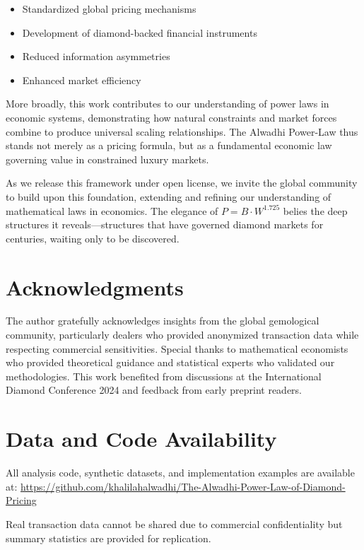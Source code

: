 \documentclass[12pt,a4paper]{article}
\theoremstyle{definition}
\theoremstyle{remark}
\begin{document}
\begin{itemize}
\item Standardized global pricing mechanisms
\item Development of diamond-backed financial instruments
\item Reduced information asymmetries
\item Enhanced market efficiency
\end{itemize}

More broadly, this work contributes to our understanding of power laws in economic systems, demonstrating how natural constraints and market forces combine to produce universal scaling relationships. The Alwadhi Power-Law thus stands not merely as a pricing formula, but as a fundamental economic law governing value in constrained luxury markets.

As we release this framework under open license, we invite the global community to build upon this foundation, extending and refining our understanding of mathematical laws in economics. The elegance of $P = B \cdot W^{1.725}$ belies the deep structures it reveals—structures that have governed diamond markets for centuries, waiting only to be discovered.

\section*{Acknowledgments}

The author gratefully acknowledges insights from the global gemological community, particularly dealers who provided anonymized transaction data while respecting commercial sensitivities. Special thanks to mathematical economists who provided theoretical guidance and statistical experts who validated our methodologies. This work benefited from discussions at the International Diamond Conference 2024 and feedback from early preprint readers.

\section*{Data and Code Availability}

All analysis code, synthetic datasets, and implementation examples are available at: \url{https://github.com/khalilahalwadhi/The-Alwadhi-Power-Law-of-Diamond-Pricing}

Real transaction data cannot be shared due to commercial confidentiality but summary statistics are provided for replication.
\end{document}
